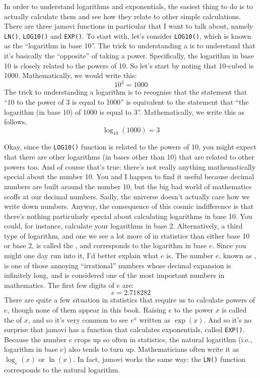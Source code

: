 In order to understand logarithms and exponentials, the easiest thing to do is to actually calculate them and see how they relate to other simple calculations. There are three jamovi functions in particular that I want to talk about, namely \texttt{LN()}, \texttt{LOG10()} and \texttt{EXP()}. To start with, let's consider \texttt{LOG10()}, which is known as the ``logarithm in base 10''. The trick to understanding a  is to understand that it's basically the ``opposite'' of taking a power. Specifically, the logarithm in base 10 is closely related to the powers of 10. So let's start by noting that 10-cubed is 1000. Mathematically, we would write this:
$$ 
10^3 = 1000
$$
The trick to understanding a logarithm is to recognise that the statement that ``10 to the power of 3 is equal to 1000'' is equivalent to the statement that ``the logarithm (in base 10) of 1000 is equal to 3''. Mathematically, we write this as follows,
$$
\log_{10}( 1000 ) = 3
$$

Okay, since the \texttt{LOG10()} function is related to the powers of 10, you might expect that there are other logarithms (in bases other than 10) that are related to other powers too. And of course that's true: there's not really anything mathematically special about the number 10. You and I happen to find it useful because decimal numbers are built around the number 10, but the big bad world of mathematics scoffs at our decimal numbers. Sadly, the universe doesn't actually care how we write down numbers. Anyway, the consequence of this cosmic indifference is that there's nothing particularly special about calculating logarithms in base 10. You could, for instance, calculate your logarithms in base 2. Alternatively, a third type of logarithm, and one we see a lot more of in statistics than either base 10 or base 2, is called the , and corresponds to the logarithm in base $e$. Since you might one day run into it, I'd better explain what $e$ is. The number $e$, known as , is one of those annoying ``irrational'' numbers whose decimal expansion is infinitely long, and is considered one of the most important numbers in mathematics. The first few digits of $e$ are:
$$
e = 2.718282 
$$ 
There are quite a few situation in statistics that require us to calculate powers of $e$, though none of them appear in this book. Raising $e$ to the power $x$ is called the  of $x$, and so it's very common to see $e^x$ written as $\exp(x)$. And so it's no surprise that jamovi has a function that calculates exponentials, called \texttt{EXP()}. Because the number $e$ crops up so often in statistics, the natural logarithm (i.e., logarithm in base $e$) also tends to turn up. Mathematicians often write it as $\log_e(x)$ or $\ln(x)$. In fact, jamovi works the same way: the \texttt{LN()} function corresponds to the natural logarithm.

